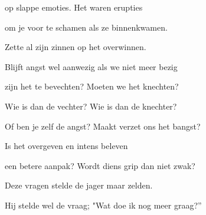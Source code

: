 op slappe emoties.
Het waren erupties

om je voor te schamen
als ze binnenkwamen.

Zette al zijn zinnen
op het overwinnen.

Blijft angst wel aanwezig
als we niet meer bezig

zijn het te bevechten?
Moeten we het knechten?

Wie is dan de vechter?
Wie is dan de knechter?

Of ben je zelf de angst?
Maakt verzet ons het bangst?

Is het overgeven
en intens beleven

een betere aanpak?
Wordt diens grip dan niet zwak?

Deze vragen stelde
de jager maar zelden.

Hij stelde wel de vraag;
"Wat doe ik nog meer graag?”
